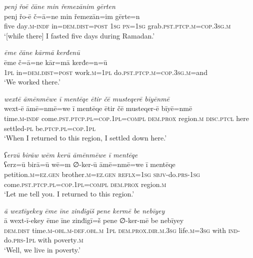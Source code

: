 \ea \label{ŽM.47}
\textit{penj řoē čāne min řemezānim gērten} \\ 
\gll penj řo-ē č=ā=ne min řemezān=im gērte=n \\ 
 five day\textsc{.m}\textsc{-indf} in=\textsc{dem.dist}\textsc{=\textsc{post}} \textsc{1sg} \textsc{pn}\textsc{=\textsc{1sg}} grab\textsc{.pst}\textsc{.ptcp}\textsc{.m}\textsc{=cop}\textsc{.3sg}\textsc{.m} \\ 
\glt `[while there] I fasted five days during Ramadan.'
\z 
 
\ea \label{ŽM.50}
\textit{ēme čāne kārmā kerđenū} \\ 
\gll ēme č=ā=ne kār=mā kerđe=n=ū \\ 
 \textsc{1pl} in=\textsc{dem.dist}\textsc{=\textsc{post}} work\textsc{.m}\textsc{=\textsc{1pl}} do\textsc{.pst}\textsc{.ptcp}\textsc{.m}\textsc{=cop}\textsc{.3sg}\textsc{.m}=and \\ 
\glt `We worked there.'
\z 
 
\ea \label{ŽM.51}
\textit{wextē āmēnmēwe ī mentēqe ētir čē musteqerē bīyēnmē} \\ 
\gll wext-ē āmē=nmē=we ī mentēqe ētir čē musteqer-ē bīyē=nmē \\ 
 time\textsc{.m}\textsc{-indf} come\textsc{.pst}\textsc{.ptcp}\textsc{.pl}\textsc{=cop}\textsc{.\textsc{1pl}}\textsc{=compl} \textsc{dem.prox} region\textsc{.m} \textsc{disc}.\textsc{ptcl} here settled\textsc{\textsc{-pl}} be\textsc{.ptcp}\textsc{.pl}\textsc{=cop}\textsc{.\textsc{1pl}} \\ 
\glt `When I returned to this region, I settled down here.'
\z 
 
\ea \label{ŽM.53}
\textit{ʕerzū birāw wēm kerū āmēnmēwe ī mentēqe} \\ 
\gll ʕerz=ū birā=ū wē=m ∅-ker-ū āmē=nmē=we ī mentēqe \\ 
 petition\textsc{.m}\textsc{=ez.gen} brother\textsc{.m}\textsc{=ez.gen} \textsc{reflx}\textsc{=\textsc{1sg}} \textsc{sbjv-}do\textsc{.prs}\textsc{-\textsc{1sg}} come\textsc{.pst}\textsc{.ptcp}\textsc{.pl}\textsc{=cop}\textsc{.\textsc{1pl}}\textsc{=compl} \textsc{dem.prox} region\textsc{.m} \\ 
\glt `Let me tell you. I returned to this region.'
\z 
 
\ea \label{ŽM.57}
\textit{ā wextīyekey ēme īne zinđigīš pene kermē be nebīyey} \\ 
\gll ā wext-ī-ekey ēme īne zinđigī=š pene ∅-ker-mē be nebīyey \\ 
 \textsc{dem.dist} time\textsc{.m}\textsc{-obl}\textsc{.m}\textsc{-def}\textsc{.obl}\textsc{.m} \textsc{1pl} \textsc{dem.prox}\textsc{.dir}\textsc{.m}\textsc{.3sg} life\textsc{.m}\textsc{=3sg} with \textsc{ind-}do\textsc{.prs}\textsc{-\textsc{1pl}} with poverty\textsc{.m} \\ 
\glt `Well, we live in poverty.'
\z 
 
